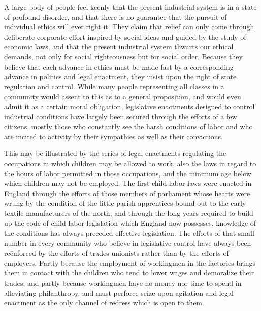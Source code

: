 \documentclass[]{article}
\begin{document}
\begin{sectionbody}
\addamsparagraph A large body of people feel keenly that the present industrial system
is in a state of profound disorder, and that there is no guarantee that
the pursuit of individual ethics will ever right it. They claim that
relief can only come through deliberate corporate effort inspired by
social ideas and guided by the study of economic laws, and that the
present industrial system thwarts our ethical demands, not only for
social righteousness but for social order. Because they believe that
each advance in ethics must be made fast by a corresponding advance in
politics and legal enactment, they insist upon the right of state
regulation and control. While many people representing all classes in a
community would assent to this as to a general proposition, and would
even admit it as a certain moral obligation, legislative enactments
designed to control industrial conditions have largely been secured
through the efforts of a few citizens, mostly those who constantly see
the harsh conditions of labor and who are incited to activity by their
sympathies as well as their convictions.

\addamsparagraph This may be illustrated by the series of legal enactments regulating the
occupations in which children may be allowed to work, also the laws in
regard to the hours of labor permitted in those occupations, and the
minimum age below which children may not be employed. The first child
labor laws were enacted in England through the efforts of those members
of parliament whose hearts were wrung by the condition of the little
parish apprentices bound out to the early textile manufacturers of the
north; and through the long years required to build up the code of child
labor legislation which England now possesses, knowledge of the
conditions has always preceded effective legislation. The efforts of
that small number in every community who believe in legislative control
have always been reënforced by the efforts of trades-unionists rather
than by the efforts of employers. Partly because the employment of
workingmen in the factories brings them in contact with the children who
tend to lower wages and demoralize their trades, and partly because
workingmen have no money nor time to spend in alleviating philanthropy,
and must perforce seize upon agitation and legal enactment as the only
channel of redress which is open to them.


\end{sectionbody}
\end{document}
